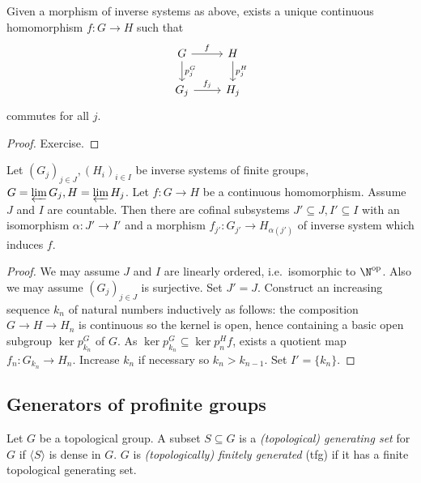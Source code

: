 \documentclass[a4paper]{article}
\begin{document}
\begin{proposition}
  Given a morphism of inverse systems as above, exists a unique continuous homomorphism \(f: G \to H\) such that
  \[
    \begin{tikzcd}
      G \ar[r, "f"] \ar[d, "p_j^G"] & H \ar[d, "p_j^H"] \\
      G_j \ar[r, "f_j"] & H_j
    \end{tikzcd}
  \]
  commutes for all \(j\).
\end{proposition}

\begin{proof}
  Exercise.
\end{proof}

\begin{proposition}
  Let \((G_j)_{j \in J}, (H_i)_{i \in I}\) be inverse systems of finite groups, \(G = \varprojlim G_j, H = \varprojlim H_j\). Let \(f: G \to H\) be a continuous homomorphism. Assume \(J\) and \(I\) are countable. Then there are cofinal subsystems \(J' \subseteq J, I' \subseteq I\) with an isomorphism \(\alpha: J' \to I'\) and a morphism \(f_{j'}: G_{j'} \to H_{\alpha(j')}\) of inverse system which induces \(f\).
\end{proposition}

\begin{proof}
  We may assume \(J\) and \(I\) are linearly ordered, i.e.\ isomorphic to \(\N^{\text{op}}\). Also we may assume \((G_j)_{j \in J}\) is surjective. Set \(J' = J\). Construct an increasing sequence \(k_n\) of natural numbers inductively as follows: the composition \(G \to H \to H_n\) is continuous so the kernel is open, hence containing a basic open subgroup \(\ker p_{k_n}^G\) of \(G\). As \(\ker p_{k_n}^G \subseteq \ker p_n^H f\), exists a quotient map \(f_n: G_{k_n} \to H_n\). Increase \(k_n\) if necessary so \(k_n > k_{n - 1}\). Set \(I' = \{k_n\}\).
\end{proof}

\subsection{Generators of profinite groups}

\begin{definition}
  Let \(G\) be a topological group. A subset \(S \subseteq G\) is a \emph{(topological) generating set} for \(G\) if \(\langle S\rangle\) is dense in \(G\). \(G\) is \emph{(topologically) finitely generated} (tfg) if it has a finite topological generating set.
\end{definition}
\end{document}
